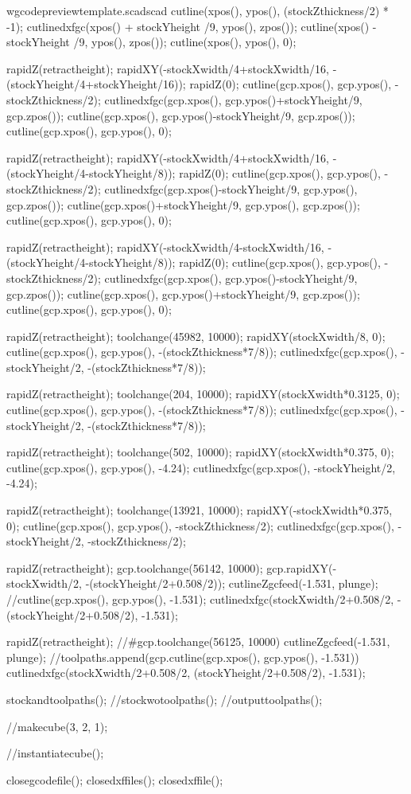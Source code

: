 \documentclass{ltxdoc}
\begin{document}
\begin{writecode}{w}{gcodepreviewtemplate.scad}{scad}
cutline(xpos(), ypos(), (stockZthickness/2) * -1);
cutlinedxfgc(xpos() + stockYheight /9, ypos(), zpos());
cutline(xpos() - stockYheight /9, ypos(), zpos());
cutline(xpos(), ypos(), 0);

rapidZ(retractheight);
rapidXY(-stockXwidth/4+stockXwidth/16, -(stockYheight/4+stockYheight/16));
rapidZ(0);
cutline(gcp.xpos(), gcp.ypos(), -stockZthickness/2);
cutlinedxfgc(gcp.xpos(), gcp.ypos()+stockYheight/9, gcp.zpos());
cutline(gcp.xpos(), gcp.ypos()-stockYheight/9, gcp.zpos());
cutline(gcp.xpos(), gcp.ypos(), 0);

rapidZ(retractheight);
rapidXY(-stockXwidth/4+stockXwidth/16, -(stockYheight/4-stockYheight/8));
rapidZ(0);
cutline(gcp.xpos(), gcp.ypos(), -stockZthickness/2);
cutlinedxfgc(gcp.xpos()-stockYheight/9, gcp.ypos(), gcp.zpos());
cutline(gcp.xpos()+stockYheight/9, gcp.ypos(), gcp.zpos());
cutline(gcp.xpos(), gcp.ypos(), 0);

rapidZ(retractheight);
rapidXY(-stockXwidth/4-stockXwidth/16, -(stockYheight/4-stockYheight/8));
rapidZ(0);
cutline(gcp.xpos(), gcp.ypos(), -stockZthickness/2);
cutlinedxfgc(gcp.xpos(), gcp.ypos()-stockYheight/9, gcp.zpos());
cutline(gcp.xpos(), gcp.ypos()+stockYheight/9, gcp.zpos());
cutline(gcp.xpos(), gcp.ypos(), 0);

rapidZ(retractheight);
toolchange(45982, 10000);
rapidXY(stockXwidth/8, 0);
cutline(gcp.xpos(), gcp.ypos(), -(stockZthickness*7/8));
cutlinedxfgc(gcp.xpos(), -stockYheight/2, -(stockZthickness*7/8));

rapidZ(retractheight);
toolchange(204, 10000);
rapidXY(stockXwidth*0.3125, 0);
cutline(gcp.xpos(), gcp.ypos(), -(stockZthickness*7/8));
cutlinedxfgc(gcp.xpos(), -stockYheight/2, -(stockZthickness*7/8));

rapidZ(retractheight);
toolchange(502, 10000);
rapidXY(stockXwidth*0.375, 0);
cutline(gcp.xpos(), gcp.ypos(), -4.24);
cutlinedxfgc(gcp.xpos(), -stockYheight/2, -4.24);

rapidZ(retractheight);
toolchange(13921, 10000);
rapidXY(-stockXwidth*0.375, 0);
cutline(gcp.xpos(), gcp.ypos(), -stockZthickness/2);
cutlinedxfgc(gcp.xpos(), -stockYheight/2, -stockZthickness/2);

rapidZ(retractheight);
gcp.toolchange(56142, 10000);
gcp.rapidXY(-stockXwidth/2, -(stockYheight/2+0.508/2));
cutlineZgcfeed(-1.531, plunge);
//cutline(gcp.xpos(), gcp.ypos(), -1.531);
cutlinedxfgc(stockXwidth/2+0.508/2, -(stockYheight/2+0.508/2), -1.531);

rapidZ(retractheight);
//#gcp.toolchange(56125, 10000)
cutlineZgcfeed(-1.531, plunge);
//toolpaths.append(gcp.cutline(gcp.xpos(), gcp.ypos(), -1.531))
cutlinedxfgc(stockXwidth/2+0.508/2, (stockYheight/2+0.508/2), -1.531);

stockandtoolpaths();
//stockwotoolpaths();
//outputtoolpaths();

//makecube(3, 2, 1);

//instantiatecube();

closegcodefile();
closedxffiles();
closedxffile();

\end{writecode}
\addtocounter{gcptmpl}{300}
\end{document}

